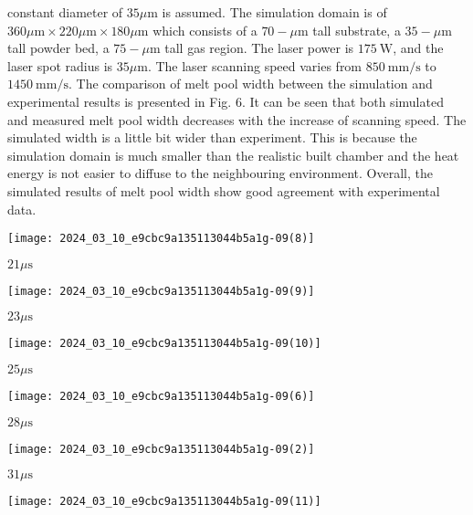 \documentclass[10pt]{article}
\begin{document}
constant diameter of $35 \mu \mathrm{m}$ is assumed. The simulation domain is of $360 \mu \mathrm{m} \times 220 \mu \mathrm{m} \times 180 \mu \mathrm{m}$ which consists of a $70-\mu \mathrm{m}$ tall substrate, a $35-\mu \mathrm{m}$ tall powder bed, a $75-\mu \mathrm{m}$ tall gas region. The laser power is $175 \mathrm{~W}$, and the laser spot radius is $35 \mu \mathrm{m}$. The laser scanning speed varies from $850 \mathrm{~mm} / \mathrm{s}$ to $1450 \mathrm{~mm} / \mathrm{s}$. The comparison of melt pool width between the simulation and experimental results is presented in Fig. 6. It can be seen that both simulated and measured melt pool width decreases with the increase of scanning speed. The simulated width is a little bit wider than experiment. This is because the simulation domain is much smaller than the realistic built chamber and the heat energy is not easier to diffuse to the neighbouring environment. Overall, the simulated results of melt pool width show good agreement with experimental data.

\begin{center}
\texttt{[image: 2024\_03\_10\_e9cbc9a135113044b5a1g-09(8)]}
\end{center}

$21 \mu \mathrm{s}$

\begin{center}
\texttt{[image: 2024\_03\_10\_e9cbc9a135113044b5a1g-09(9)]}
\end{center}

$23 \mu \mathrm{s}$

\begin{center}
\texttt{[image: 2024\_03\_10\_e9cbc9a135113044b5a1g-09(10)]}
\end{center}

$25 \mu \mathrm{s}$

\begin{center}
\texttt{[image: 2024\_03\_10\_e9cbc9a135113044b5a1g-09(6)]}
\end{center}

$28 \mu \mathrm{s}$

\begin{center}
\texttt{[image: 2024\_03\_10\_e9cbc9a135113044b5a1g-09(2)]}
\end{center}

$31 \mu \mathrm{s}$

\begin{center}
\texttt{[image: 2024\_03\_10\_e9cbc9a135113044b5a1g-09(11)]}
\end{center}
\end{document}
